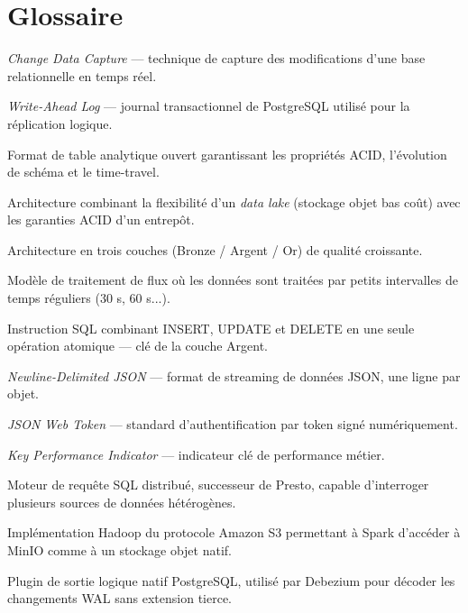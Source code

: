 \documentclass[12pt,a4paper]{report}
\begin{document}
\chapter{Glossaire}

\begin{description}[style=nextline, leftmargin=4cm]
    \item[CDC]
        \textit{Change Data Capture} --- technique de capture des
        modifications d'une base relationnelle en temps réel.

    \item[WAL]
        \textit{Write-Ahead Log} --- journal transactionnel de PostgreSQL
        utilisé pour la réplication logique.

    \item[Iceberg]
        Format de table analytique ouvert garantissant les propriétés ACID,
        l'évolution de schéma et le time-travel.

    \item[Lakehouse]
        Architecture combinant la flexibilité d'un \textit{data lake}
        (stockage objet bas coût) avec les garanties ACID d'un entrepôt.

    \item[Medallion]
        Architecture en trois couches (Bronze / Argent / Or) de qualité
        croissante.

    \item[Micro-batch]
        Modèle de traitement de flux où les données sont traitées par
        petits intervalles de temps réguliers (30 s, 60 s...).

    \item[MERGE INTO]
        Instruction SQL combinant INSERT, UPDATE et DELETE en une seule
        opération atomique --- clé de la couche Argent.

    \item[NDJSON]
        \textit{Newline-Delimited JSON} --- format de streaming de données
        JSON, une ligne par objet.

    \item[JWT]
        \textit{JSON Web Token} --- standard d'authentification par token
        signé numériquement.

    \item[KPI]
        \textit{Key Performance Indicator} --- indicateur clé de performance
        métier.

    \item[Trino]
        Moteur de requête SQL distribué, successeur de Presto, capable
        d'interroger plusieurs sources de données hétérogènes.

    \item[S3A]
        Implémentation Hadoop du protocole Amazon S3 permettant à Spark
        d'accéder à MinIO comme à un stockage objet natif.

    \item[pgoutput]
        Plugin de sortie logique natif PostgreSQL, utilisé par Debezium
        pour décoder les changements WAL sans extension tierce.
\end{description}
\end{document}
